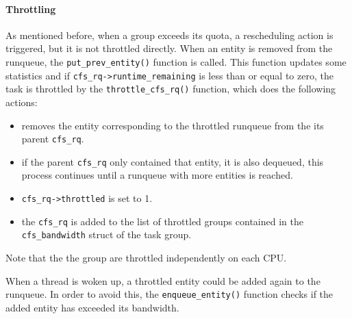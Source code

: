 \paragraph{Throttling}%
As mentioned before, when a group exceeds its quota, a rescheduling action is triggered, but it is not throttled directly. When an entity is removed from the runqueue, the \verb|put_prev_entity()| function is called. This function updates some statistics and if \verb|cfs_rq->runtime_remaining| is less than or equal to zero, the task is throttled by the \verb|throttle_cfs_rq()| function, which does the following actions:
\begin{itemize}
    \item removes the entity corresponding to the throttled runqueue from the its parent \verb|cfs_rq|.
    \item if the parent \verb|cfs_rq| only contained that entity, it is also dequeued, this process continues until a runqueue with more entities is reached.
    \item \verb|cfs_rq->throttled| is set to 1.
    \item the \verb|cfs_rq| is added to the list of throttled groups contained in the \verb|cfs_bandwidth| struct of the task group.
\end{itemize}
Note that the the group are throttled independently on each CPU.

When a thread is woken up, a throttled entity could be added again to the runqueue. In order to avoid this, the \verb|enqueue_entity()| function checks if the added entity has exceeded its bandwidth.

